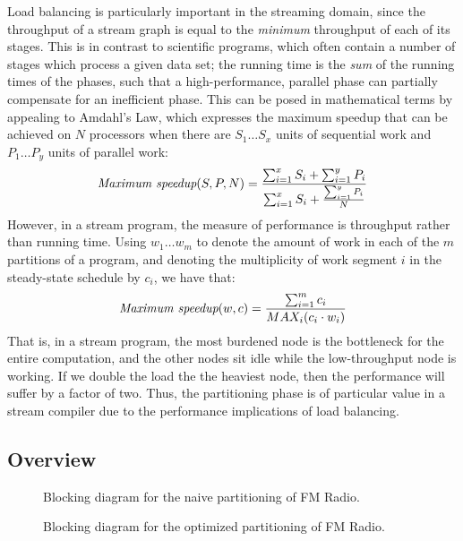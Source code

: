 Load balancing is particularly important in the streaming domain,
since the throughput of a stream graph is equal to the {\it minimum}
throughput of each of its stages.  This is in contrast to scientific
programs, which often contain a number of stages which process a given
data set; the running time is the {\it sum} of the running times of
the phases, such that a high-performance, parallel phase can partially
compensate for an inefficient phase.  This can be posed in
mathematical terms by appealing to Amdahl's Law, which expresses the
maximum speedup that can be achieved on $N$ processors when there are
$S_1 \dots S_x$ units of sequential work and $P_1 \dots P_y$ units of
parallel work:
\begin{align*}
\mbox{\it Maximum speedup}(S, P, N) = \frac{\sum_{i=1}^x{S_i}+\sum_{i=1}^y{P_i}}{\sum_{i=1}^x{S_i}+\frac{\sum_{i=1}^y{P_i}}{N}}
\end{align*}
However, in a stream program, the measure of performance is throughput
rather than running time.  Using $w_1 \dots w_m$ to denote the amount
of work in each of the $m$ partitions of a program, and denoting the
multiplicity of work segment $i$ in the steady-state schedule by
$c_i$, we have that:
\begin{align*}
\mbox{\it Maximum speedup}(w, c) = \frac{\sum_{i=1}^m{c_i}}{MAX_i(c_i \cdot w_i)}
\end{align*}
That is, in a stream program, the most burdened node is the bottleneck
for the entire computation, and the other nodes sit idle while the
low-throughput node is working.  If we double the load the the
heaviest node, then the performance will suffer by a factor of two.
Thus, the partitioning phase is of particular value in a stream
compiler due to the performance implications of load balancing.

\subsection{Overview}

\begin{figure}[t]
\vspace{-6pt}
\begin{minipage}{3.1in}
\vspace{-12pt}
\caption{\protect\small Blocking diagram for the naive partitioning of
 FM Radio.
\protect\label{fig:fmblood1}}
\end{minipage}
\hspace{0.3in}
\vspace{-12pt}
\begin{minipage}{3.1in}
\caption{\protect\small Blocking diagram for the optimized
partitioning of FM Radio.
\protect\label{fig:fmblood2}}
\end{minipage}
\vspace{-6pt}
\end{figure}

